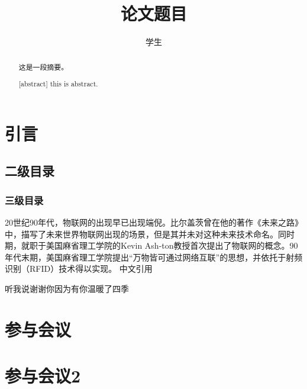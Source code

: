 \documentclass[]{GZUthesis}
\author{学生}
\title{论文题目}
\begin{document}
\maketitle
\page
\begin{abstract}
    这是一段摘要。
\end{abstract}
\newline
{}
\newpage
\begin{abstract}[abstract]
    this is abstract.
\end{abstract}
\newpage
\tableofcontents
\newpage
\content
\section{引言}
\subsection{二级目录}
\subsubsection{三级目录}

20世纪90年代，物联网的出现早已出现端倪。比尔盖茨曾在他的著作《未来之路》中，描写了未来世界物联网出现的场景，但是其并未对这种未来技术命名。\cite{gates1995road}同时期，就职于美国麻省理工学院的Kevin Ash-ton教授首次提出了物联网的概念。90年代末期，美国麻省理工学院提出“万物皆可通过网络互联”的思想，并依托于射频识别（RFID）技术得以实现。
中文引用\cite{孙其博2010物联网}


\newpage
\begin{thank}
    听我说谢谢你因为有你温暖了四季
\end{thank}
\newpage\printbibliography
\newpage

\begin{appendices}
    \section{参与会议}

    \section{参与会议2}
\end{appendices}
\promise
\end{document}
